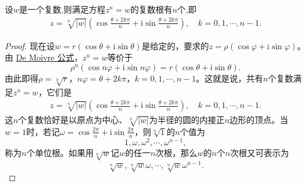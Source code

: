 \documentclass[../../main.tex]{subfiles}
\begin{document}
\begin{proposition}
设$w$是一个复数,则满足方程$z^n=w$的复数根有$n$个,即
\begin{align*}
z = \sqrt[n]{|w|}\left( \cos\frac{\theta + 2k\pi}{n} + \mathrm{i}\sin\frac{\theta + 2k\pi}{n} \right),\quad k = 0, 1, \cdots, n - 1.
\end{align*}
\end{proposition}
\begin{proof}
现在设\(w = r(\cos\theta + \mathrm{i}\sin\theta)\)是给定的，要求的\(z = \rho(\cos\varphi + \mathrm{i}\sin\varphi)\)。由 \hyperref[theorem:De Moivre公式]{De Moivre 公式}，\(z^n = w\)等价于
\[
\rho^n(\cos n\varphi + \mathrm{i}\sin n\varphi) = r(\cos\theta + \mathrm{i}\sin\theta).
\]
由此即得\(\rho = \sqrt[n]{r}\)，\(n\varphi = \theta + 2k\pi\)，\(k = 0, 1, \cdots, n - 1\)。这就是说，共有\(n\)个复数满足\(z^n = w\)，它们是
\[
\begin{split}
z = \sqrt[n]{|w|}\left( \cos\frac{\theta + 2k\pi}{n} + \mathrm{i}\sin\frac{\theta + 2k\pi}{n} \right),\quad k = 0, 1, \cdots, n - 1.
\end{split}
\]
这\(n\)个复数恰好是以原点为中心、\(\sqrt[n]{|w|}\)为半径的圆的内接正\(n\)边形的顶点。当\(w = 1\)时，若记\(\omega = \cos\frac{2\pi}{n} + \mathrm{i}\sin\frac{2\pi}{n}\)，则\(\sqrt[n]{1}\)的\(n\)个值为
\[
1, \omega, \omega^2, \cdots, \omega^{n - 1},
\]
称为\(n\)个单位根。如果用\(\sqrt[n]{w}\)记\(w\)的任一\(n\)次根，那么\(w\)的\(n\)个\(n\)次根又可表示为
\[
\sqrt[n]{w}, \sqrt[n]{w}\omega, \cdots, \sqrt[n]{w}\omega^{n - 1}.
\]
\end{proof}
\end{document}
